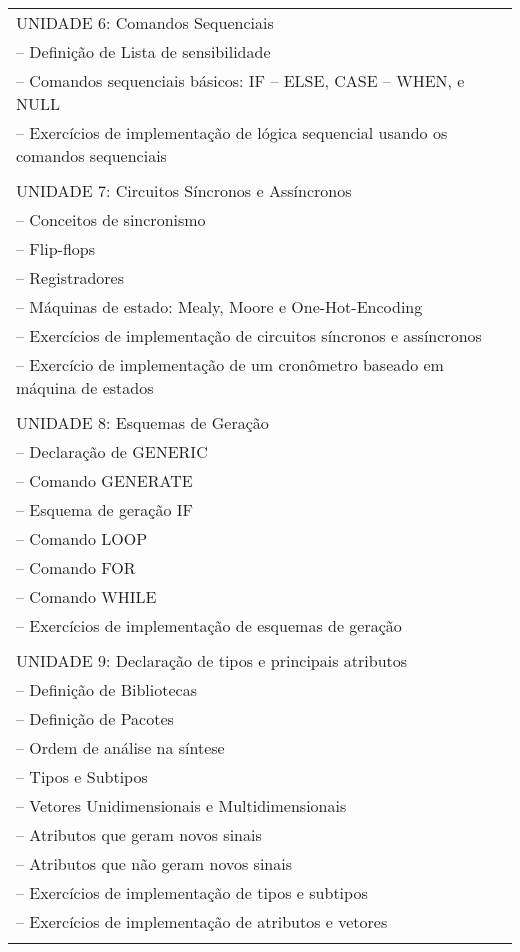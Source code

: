 \documentclass[12pt]{article}
\begin{document}
\begin{longtable}{|L{1.025\textwidth}|}
UNIDADE 6: Comandos Sequenciais\\
– Definição de Lista de sensibilidade\\
– Comandos sequenciais básicos: IF – ELSE, CASE – WHEN, e NULL\\
– Exercícios de implementação de lógica sequencial usando os comandos sequenciais\\
\\

UNIDADE 7: Circuitos Síncronos e Assíncronos\\
– Conceitos de sincronismo\\
– Flip-flops\\
– Registradores\\
– Máquinas de estado: Mealy, Moore e One-Hot-Encoding\\
– Exercícios de implementação de circuitos síncronos e assíncronos\\
– Exercício de implementação de um cronômetro baseado em máquina de estados\\
\\

UNIDADE 8: Esquemas de Geração\\
– Declaração de GENERIC\\
– Comando GENERATE\\
– Esquema de geração IF\\
– Comando LOOP\\
– Comando FOR\\
– Comando WHILE\\
– Exercícios de implementação de esquemas de geração\\
\\

UNIDADE 9: Declaração de tipos e principais atributos\\
– Definição de Bibliotecas\\
– Definição de Pacotes\\
– Ordem de análise na síntese\\
– Tipos e Subtipos\\
– Vetores Unidimensionais e Multidimensionais\\
– Atributos que geram novos sinais\\
– Atributos que não geram novos sinais\\
– Exercícios de implementação de tipos e subtipos\\
– Exercícios de implementação de atributos e vetores\\
\\


\end{longtable}
\end{document}
